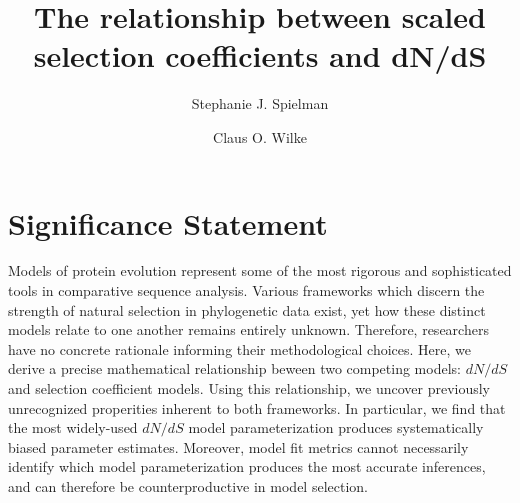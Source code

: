 \documentclass[11pt]{article}
\begin{document}
	
	
\title{The relationship between scaled selection coefficients and dN/dS}
	
\author{Stephanie J. Spielman 
	\and
	Claus O. Wilke
}
	

		
\section*{Significance Statement} 
Models of protein evolution represent some of the most rigorous and sophisticated tools in comparative sequence analysis. Various frameworks which discern the strength of natural selection in phylogenetic data exist, yet how these distinct models relate to one another remains entirely unknown. Therefore, researchers have no concrete rationale informing their methodological choices. Here, we derive a precise mathematical relationship beween two competing models: $dN/dS$ and selection coefficient models. Using this relationship, we uncover previously unrecognized properities inherent to both frameworks. In particular, we find that the most widely-used $dN/dS$ model parameterization produces systematically biased parameter estimates. Moreover, model fit metrics cannot necessarily identify which model parameterization produces the most accurate inferences, and can therefore be counterproductive in model selection. %
\end{document}
